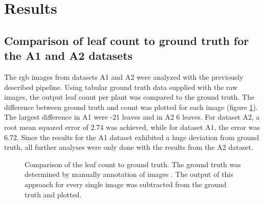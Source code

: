 \documentclass[paper=A4,bibliography=totocnumbered]{scrartcl}
\begin{document}
\section{Results}
\subsection{Comparison of leaf count to ground truth for the A1 and A2 datasets}
The rgb images from datasets A1 and A2 were analyzed with the previously described pipeline. Using tabular ground truth data supplied with the raw images, the output leaf count per plant was compared to the ground truth. The difference between ground truth and count was plotted for each image (figure \ref{fig:truth}). The largest difference in A1 were -21 leaves and in A2 6 leaves. For dataset A2, a root mean squared error of 2.74 was achieved, while for dataset A1, the error was 6.72. Since the results for the A1 dataset exhibited a huge deviation from ground truth, all further analyses were only done with the results from the A2 dataset.

\begin{figure}[h!]
	\qquad
	\caption{Comparison of the leaf count to ground truth. The ground truth was determined by manually annotation of images \citep{Scharr.2014}. The output of this approach for every single image was subtracted from the ground truth and plotted.}
	\label{fig:truth}
\end{figure}
\end{document}
